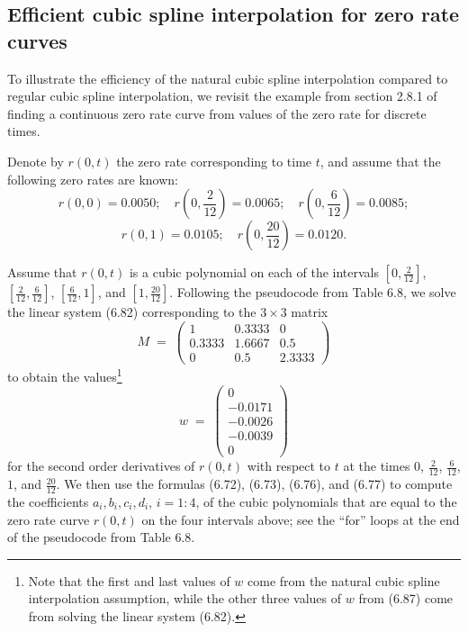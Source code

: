 \subsection{Efficient cubic spline interpolation for zero rate curves}

To illustrate the efficiency of the natural cubic spline interpolation compared to
regular cubic spline interpolation, we revisit the example from section 2.8.1 of
finding a continuous zero rate curve from values of the zero rate for discrete times.

Denote by $r(0,t)$ the zero rate corresponding to time $t$, and assume that the
following zero rates are known:
\[
r(0,0) = 0.0050; \quad r\left(0,\frac{2}{12}\right) = 0.0065; \quad
r\left(0,\frac{6}{12}\right) = 0.0085;
\]
\[
r(0,1) = 0.0105; \quad r\left(0,\frac{20}{12}\right) = 0.0120.
\]

Assume that $r(0,t)$ is a cubic polynomial on each of the intervals
$\left[0,\frac{2}{12}\right]$, $\left[\frac{2}{12},\frac{6}{12}\right]$,
$\left[\frac{6}{12},1\right]$, and $\left[1,\frac{20}{12}\right]$. Following the
pseudocode from Table 6.8, we solve the linear system (6.82) corresponding to the
$3 \times 3$ matrix
\begin{equation}
M \;=\; \begin{pmatrix} 1 & 0.3333 & 0 \\ 0.3333 & 1.6667 & 0.5 \\ 0 & 0.5 & 2.3333
\end{pmatrix}
\end{equation}
to obtain the values\footnote{Note that the first and last values of $w$ come from the
natural cubic spline interpolation assumption, while the other three values of $w$ from
(6.87) come from solving the linear system (6.82).}
\begin{equation}
w \;=\; \begin{pmatrix} 0 \\ -0.0171 \\ -0.0026 \\ -0.0039 \\ 0 \end{pmatrix}
\end{equation}
for the second order derivatives of $r(0,t)$ with respect to $t$ at the times $0$,
$\frac{2}{12}$, $\frac{6}{12}$, $1$, and $\frac{20}{12}$. We then use the formulas
(6.72), (6.73), (6.76), and (6.77) to compute the coefficients $a_i, b_i, c_i, d_i$,
$i = 1:4$, of the cubic polynomials that are equal to the zero rate curve $r(0,t)$ on
the four intervals above; see the ``for'' loops at the end of the pseudocode from
Table 6.8.

